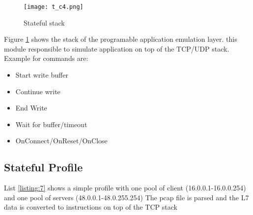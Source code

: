 \documentclass[conference]{IEEEtran}
\begin{document}
\begin{figure}[h]
  \texttt{[image: t\_c4.png]}
  \caption{Stateful stack}
  \label{fig:astf_stack}
\end{figure}

Figure \ref{fig:astf_stack} shows the stack of the programable application emulation layer. this module responsible to simulate application on top of the TCP/UDP stack. 
Example for commands are:

\begin{itemize}
  \item Start write buffer
  \item Continue write
  \item End Write
  \item Wait for buffer/timeout
  \item OnConnect/OnReset/OnClose
\end{itemize}


\subsection{ Stateful Profile }


List \ref{listing:7} shows a simple profile with one pool of client (16.0.0.1-16.0.0.254) and one pool of servers (48.0.0.1-48.0.255.254) 
The pcap file is parsed and the L7 data is converted to instructions on top of the TCP stack 
\end{document}
